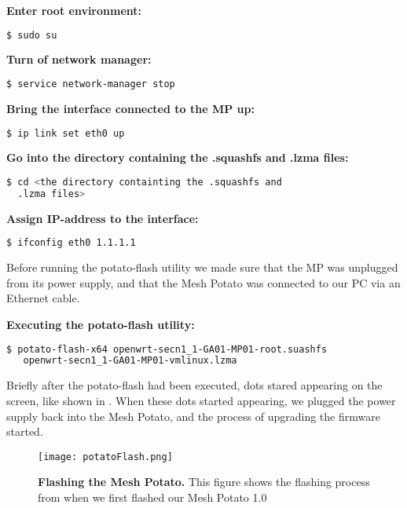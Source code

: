 \begin{framed}
\noindent \textbf{Enter root environment:} 
\begin{lstlisting}[language=bash]
  $ sudo su
\end{lstlisting}

\noindent \textbf{Turn of network manager:}
\begin{lstlisting}[language=bash]
  $ service network-manager stop
\end{lstlisting}

\noindent \textbf{Bring the interface connected to the MP up:}
\begin{lstlisting}[language=bash]
  $ ip link set eth0 up
\end{lstlisting}

\noindent \textbf{Go into the directory containing the .squashfs and .lzma files:}
\begin{lstlisting}[language=bash]
  $ cd <the directory containting the .squashfs and 
  .lzma files>
\end{lstlisting}

\noindent \textbf{Assign IP-address to the interface:}
\begin{lstlisting}[language=bash]
  $ ifconfig eth0 1.1.1.1
\end{lstlisting}

Before running the potato-flash utility we made sure that the MP was unplugged from its power supply, and that the Mesh Potato was connected to our PC via an Ethernet cable. 

\noindent \textbf{Executing the potato-flash utility:}
\begin{lstlisting}[language=bash]
  $ potato-flash-x64 openwrt-secn1_1-GA01-MP01-root.suashfs 
   openwrt-secn1_1-GA01-MP01-vmlinux.lzma
\end{lstlisting}
\end{framed}

Briefly after the potato-flash had been executed, dots stared appearing on the screen, like shown in . When these dots started appearing, we plugged the power supply back into the Mesh Potato, and the process of upgrading the firmware started. 

\begin{figure}[t]
  \centering
      \texttt{[image: potatoFlash.png]}
  \caption [Flashing the Mesh Potato]{\textbf{Flashing the Mesh Potato.} This figure shows the flashing process from when we first flashed our Mesh Potato 1.0}
  \label{fig:flashing}
\end{figure}


